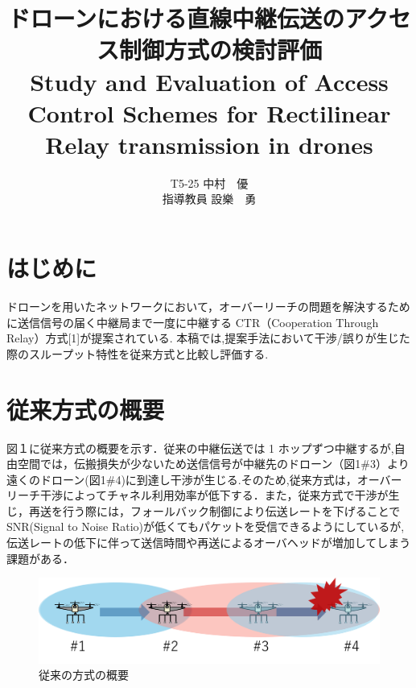 \documentclass[a4paper,10pt]{ltjsarticle}
\title{\huge ドローンにおける直線中継伝送のアクセス制御方式の検討評価\\
\Large Study and Evaluation of Access Control Schemes for Rectilinear Relay transmission in drones
}
\author{
T5-25 \:中村　優\\
指導教員 \: 設樂　勇
}
\date{}
\begin{document}
\twocolumn[
\maketitle
]

\section{はじめに}
ドローンを用いたネットワークにおいて，オーバーリーチの問題を解決するために送信信号の届く中継局まで一度に中継する CTR（Cooperation Through Relay）方式[1]が提案されている. 本稿では,提案手法において干渉/誤りが生じた際のスループット特性を従来方式と比較し評価する.
\section{従来方式の概要}
図１に従来方式の概要を示す．従来の中継伝送では 1 ホップずつ中継するが,自由空間では，伝搬損失が少ないため送信信号が中継先のドローン（図1\#3）より遠くのドローン(図1\#4)に到達し干渉が生じる.そのため,従来方式は，オーバーリーチ干渉によってチャネル利用効率が低下する．また，従来方式で干渉が生じ，再送を行う際には，フォールバック制御により伝送レートを下げることでSNR(Signal to Noise Ratio)が低くてもパケットを受信できるようにしているが,伝送レートの低下に伴って送信時間や再送によるオーバヘッドが増加してしまう課題がある．


\begin{figure}[htbp]
  \centering
  \includegraphics[width=\linewidth]{cenventional_topology.png} %
  \caption{従来の方式の概要}
  \label{fig:従来の方式のトポロジー} %
\end{figure}
\end{document}
